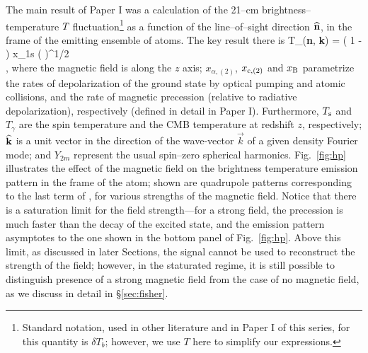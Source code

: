 The main result of Paper I was a calculation of the 21--cm brightness--temperature $T_{\rm }$ fluctuation\footnote{Standard notation, used in other literature and in Paper I of this series, for this quantity is $\delta T_b$; however, we use $T$ here to simplify our expressions.} as a function of the line--of--sight direction ${\bf{\widehat n}}$, in the frame of the emitting ensemble of atoms. The key result there is
\beq
\bga
   T_{\rm }({\bf{\widehat n}}, {\bf{\widehat k}}) = \left( 1 -  \right) x_{1{\rm s}} \left(  \right)^{1/2} \\
  \times {} \mbox{,} 
\ega
\label{eq:tbsoln}
\eeq
where the magnetic field is along the $z$ axis; $x_{\alpha, (2)}$, $x_{{\rm c}, (2)}$ and $x_{\rm B}$ parametrize the rates of depolarization of the ground state by optical pumping and atomic collisions, and the rate of magnetic precession (relative to radiative depolarization), respectively (defined in detail in Paper I). Furthermore,  $T_{\rm s}$ and $T_\gamma$ are the spin temperature and the CMB temperature at redshift $z$, respectively; $\bf{\widehat k}$ is a unit vector in the direction of the wave-vector $\vec k$ of a given density Fourier mode; and $Y_{2 m}$ represent the usual spin--zero spherical harmonics. Fig.~\ref{fig:hp} illustrates the effect of the magnetic field on the brightness temperature emission pattern in the frame of the atom; shown are quadrupole patterns corresponding to the last term of \eq{\ref{eq:tbsoln}}, for various strengths of the magnetic field. Notice that there is a saturation limit for the field strength---for a strong field, the precession is much faster than the decay of the excited state, and the emission pattern asymptotes to the one shown in the bottom panel of Fig.~\ref{fig:hp}. Above this limit, as discussed in later Sections, the signal cannot be used to reconstruct the strength of the field; however, in the staturated regime, it is still possible to distinguish presence of a strong magnetic field from the case of no magnetic field, as we discuss in detail in \S\ref{sec:fisher}.
